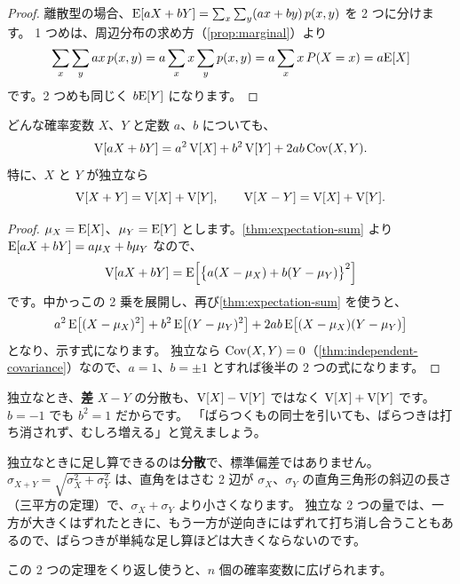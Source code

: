 \begin{proof}
  離散型の場合、$\mathrm{E}[aX + bY] = \sum_x \sum_y (ax + by)\, p(x, y)$ を 2 つに分けます。
  1 つめは、周辺分布の求め方（\cref{prop:marginal}）より
  \[
    \sum_x \sum_y a x\, p(x, y) = a \sum_x x \sum_y p(x, y) = a \sum_x x\, P(X = x) = a\mathrm{E}[X]
  \]
  です。2 つめも同じく $b\mathrm{E}[Y]$ になります。
\end{proof}

\begin{theorem}
  どんな確率変数 $X$、$Y$ と定数 $a$、$b$ についても、
  \[
    \mathrm{V}[aX + bY] = a^2\, \mathrm{V}[X] + b^2\, \mathrm{V}[Y] + 2ab\, \mathrm{Cov}(X, Y).
  \]
  特に、$X$ と $Y$ が独立なら
  \[
    \mathrm{V}[X + Y] = \mathrm{V}[X] + \mathrm{V}[Y], \qquad \mathrm{V}[X - Y] = \mathrm{V}[X] + \mathrm{V}[Y].
  \]
\end{theorem}

\begin{proof}
  $\mu_X = \mathrm{E}[X]$、$\mu_Y = \mathrm{E}[Y]$ とします。\cref{thm:expectation-sum} より $\mathrm{E}[aX + bY] = a\mu_X + b\mu_Y$ なので、
  \[
    \mathrm{V}[aX + bY] = \mathrm{E}\Bigl[\bigl\{a(X - \mu_X) + b(Y - \mu_Y)\bigr\}^2\Bigr]
  \]
  です。中かっこの 2 乗を展開し、再び\cref{thm:expectation-sum} を使うと、
  \[
    a^2\, \mathrm{E}\bigl[(X - \mu_X)^2\bigr] + b^2\, \mathrm{E}\bigl[(Y - \mu_Y)^2\bigr] + 2ab\, \mathrm{E}\bigl[(X - \mu_X)(Y - \mu_Y)\bigr]
  \]
  となり、示す式になります。
  独立なら $\mathrm{Cov}(X, Y) = 0$（\cref{thm:independent-covariance}）なので、$a = 1$、$b = \pm 1$ とすれば後半の 2 つの式になります。
\end{proof}

\begin{exampoint}
  独立なとき、\textbf{差} $X - Y$ の分散も、$\mathrm{V}[X] - \mathrm{V}[Y]$ ではなく $\mathrm{V}[X] + \mathrm{V}[Y]$ です。
  $b = -1$ でも $b^2 = 1$ だからです。
  「ばらつくもの同士を引いても、ばらつきは打ち消されず、むしろ増える」と覚えましょう。
\end{exampoint}

\begin{intuition}
  独立なときに足し算できるのは\textbf{分散}で、標準偏差ではありません。
  $\sigma_{X+Y} = \sqrt{\sigma_X^2 + \sigma_Y^2}$ は、直角をはさむ 2 辺が $\sigma_X$、$\sigma_Y$ の直角三角形の斜辺の長さ（三平方の定理）で、$\sigma_X + \sigma_Y$ より小さくなります。
  独立な 2 つの量では、一方が大きくはずれたときに、もう一方が逆向きにはずれて打ち消し合うこともあるので、ばらつきが単純な足し算ほどは大きくならないのです。
\end{intuition}

この 2 つの定理をくり返し使うと、$n$ 個の確率変数に広げられます。

